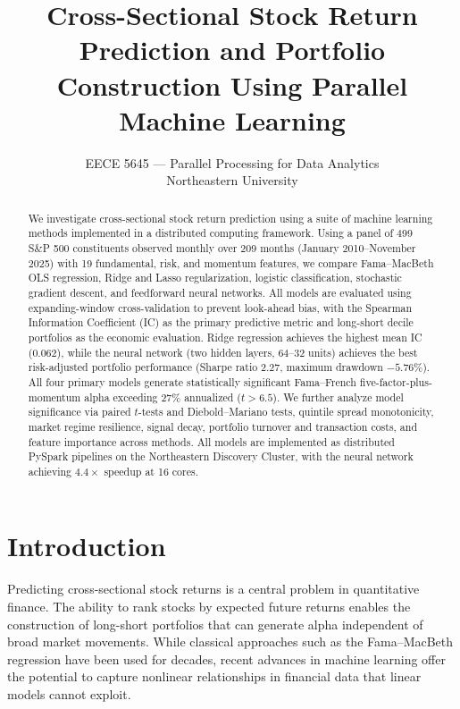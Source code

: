 \documentclass[11pt]{article}
\title{\textbf{Cross-Sectional Stock Return Prediction and Portfolio Construction Using Parallel Machine Learning}}
\author{
    EECE 5645 --- Parallel Processing for Data Analytics\\
    Northeastern University
}
\date{}
\begin{document}
\maketitle

\begin{abstract}
We investigate cross-sectional stock return prediction using a suite of machine learning methods implemented in a distributed computing framework. Using a panel of 499 S\&P 500 constituents observed monthly over 209 months (January 2010--November 2025) with 19 fundamental, risk, and momentum features, we compare Fama--MacBeth OLS regression, Ridge and Lasso regularization, logistic classification, stochastic gradient descent, and feedforward neural networks. All models are evaluated using expanding-window cross-validation to prevent look-ahead bias, with the Spearman Information Coefficient (IC) as the primary predictive metric and long-short decile portfolios as the economic evaluation. Ridge regression achieves the highest mean IC (0.062), while the neural network (two hidden layers, 64--32 units) achieves the best risk-adjusted portfolio performance (Sharpe ratio 2.27, maximum drawdown $-5.76\%$). All four primary models generate statistically significant Fama--French five-factor-plus-momentum alpha exceeding 27\% annualized ($t > 6.5$). We further analyze model significance via paired $t$-tests and Diebold--Mariano tests, quintile spread monotonicity, market regime resilience, signal decay, portfolio turnover and transaction costs, and feature importance across methods. All models are implemented as distributed PySpark pipelines on the Northeastern Discovery Cluster, with the neural network achieving $4.4\times$ speedup at 16 cores.
\end{abstract}

\section{Introduction}
\label{sec:intro}

Predicting cross-sectional stock returns is a central problem in quantitative finance. The ability to rank stocks by expected future returns enables the construction of long-short portfolios that can generate alpha independent of broad market movements. While classical approaches such as the Fama--MacBeth regression \cite{fama1973} have been used for decades, recent advances in machine learning offer the potential to capture nonlinear relationships in financial data that linear models cannot exploit.
\end{document}
